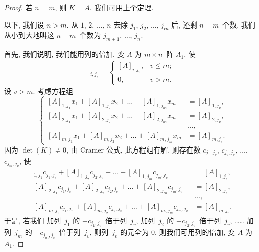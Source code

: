 \documentclass[../libro.tex]{subfiles}
\begin{document}
\begin{proof}
    若 \(n = m\), 则 \(K = A\).
    我们可用上个定理.

    以下, 我们设 \(n > m\).
    从 \(1\), \(2\), \(\dots\), \(n\)
    去除 \(j_1\), \(j_2\), \(\dots\), \(j_m\) 后,
    还剩 \(n - m\)~个数.
    我们从小到大地叫这 \(n - m\)~个数为
    \(j_{m+1}\), \(\dots\), \(j_n\).

    首先, 我们说明, 我们能用列的倍加,
    变 \(A\) 为 \(m \times n\)~阵 \(A_1\),
    使
    \begin{align*}
        [A_1]_{i,j_v} =
        \begin{cases}
            [A]_{i,j_v}, & v \leq m; \\
            0,           & v > m.
        \end{cases}
    \end{align*}
    设 \(v > m\).
    考虑方程组
    \begin{equation*}
        \left\{ %
        \begin{aligned}
            [A]_{1,j_1} x_1 + [A]_{1,j_2} x_2 + \dots + [A]_{1,j_m} x_m & = [A]_{1,j_v}, \\
            [A]_{2,j_1} x_1 + [A]_{2,j_2} x_2 + \dots + [A]_{2,j_m} x_m & = [A]_{2,j_v}, \\
            & \dots, \\
            [A]_{m,j_1} x_1 + [A]_{m,j_2} x_2 + \dots + [A]_{m,j_m} x_m & = [A]_{m,j_v}.
        \end{aligned}
        \right. %
    \end{equation*}
    因为 \(\det {(K)} \neq 0\),
    由 Cramer 公式,
    此方程组有解.
    则存在数
    \(c_{j_1,j_v}\), \(c_{j_2,j_v}\), \(\dots\), \(c_{j_m,j_v}\),
    使
    \begin{align*}
        [A]_{1,j_1} c_{j_1,j_v} + [A]_{1,j_2} c_{j_2,j_v} + \dots + [A]_{1,j_m} c_{j_m,j_v} & = [A]_{1,j_v}, \\
        [A]_{2,j_1} c_{j_1,j_v} + [A]_{2,j_2} c_{j_2,j_v} + \dots + [A]_{2,j_m} c_{j_m,j_v} & = [A]_{2,j_v}, \\
        & \dots, \\
        [A]_{m,j_1} c_{j_1,j_v} + [A]_{m,j_2} c_{j_2,j_v} + \dots + [A]_{m,j_m} c_{j_m,j_v} & = [A]_{m,j_v}.
    \end{align*}
    于是, 若我们%
    加列~\(j_1\) 的 \(-c_{j_1,j_v}\)~倍于列~\(j_v\),
    加列~\(j_2\) 的 \(-c_{j_2,j_v}\)~倍于列~\(j_v\),
    ……
    加列~\(j_m\) 的 \(-c_{j_m,j_v}\)~倍于列~\(j_v\),
    则列~\(j_v\) 的元全为 \(0\).
    则我们可用列的倍加, 变 \(A\) 为 \(A_1\).


\end{proof}
\end{document}

